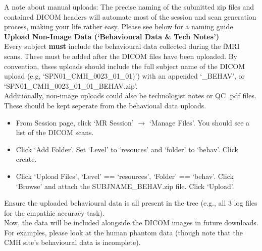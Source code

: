 \documentclass[a4paper,11pt,oneside]{book}
\newcommand\titlesR{%
    \noindent
    \small
    \leftskip=0.15in
    \textbf
}
\newcommand\stepsR{
    \noindent
    \leftskip=0.3in
    \small
}
\begin{document}
\begin{multicols}{2}
{\stepsR{A note about manual uploads: The precise naming of the submitted zip files and contained DICOM headers will automate most of the session and scan generation process, making your life rather easy. Please see below for a naming guide.}\\


%
\titlesR{Upload Non-Image Data (`Behavioural Data \& Tech Notes')} \\

\stepsR{Every subject \textbf{must} include the behavioural data collected during the fMRI scans. These must be added after the DICOM files have been uploaded. By convention, thses uploads should include the full subject name of the DICOM upload (e.g, `SPN01\_CMH\_0023\_01\_01)') with an appended `\_BEHAV', or `SPN01\_CMH\_0023\_01\_01\_BEHAV.zip'.}\\

\stepsR{Additionally, non-image uploads could also be technologist notes or QC .pdf files. These should be kept seperate from the behavioual data uploads.}\\

\stepsR{\begin{itemize}

    \item{From Session page, click `MR Session' $\rightarrow$ `Manage Files'. You should see a list of the DICOM scans.}\\

    \item{Click `Add Folder'. Set `Level' to `resouces' and `folder' to `behav'. Click create.}\\

    \item{Click `Upload Files', `Level' == `resources', `Folder' == `behav'. Click `Browse' and attach the SUBJNAME\_BEHAV.zip file. Click `Upload'.}\\
    
    \end{itemize}
}

\stepsR{Ensure the uploaded behavioural data is all present in the tree (e.g., all 3 log files for the empathic accuracy task).}\\

\stepsR{Now, the data will be included alongside the DICOM images in future downloads. For examples, please look at the human phantom data (though note that the CMH site's behavioural data is incomplete).}\\

}
\end{multicols}
\end{document}
